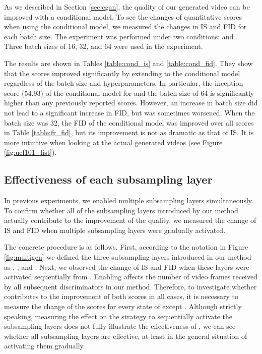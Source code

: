 \documentclass[twocolumn]{svjour3}
\def\Fig#1{Figure \ref{fig:#1}}
\def\Table#1{Table \ref{table:#1}}
\def\Sec#1{Section \ref{sec:#1}}
\begin{document}
As we described in \Sec{cgan}, the quality of our generated video
can be improved with a conditional model.
To see the changes of quantitative scores when using the conditional model,
we measured the changes in IS and FID for each batch size.
The experiment was performed under two conditions:  and .
Three batch sizes of 16, 32, and 64 were used in the experiment.

The results are shown in Tables \ref{table:cond_is} and \ref{table:cond_fid}.
They show that the scores improved significantly by extending to the conditional model
regardless of the batch size and hyperparameters.
In particular, the inception score (54.93) of the conditional model for 
and the batch size of 64 is significantly higher than any previously reported scores.
However, an increase in batch size did not lead to a significant increase in FID,
but was sometimes worsened.
When the batch size was 32, the FID of the conditional model was improved
over all scores in \Table{fr_fid},
but its improvement is not as dramatic as that of IS.
It is more intuitive when looking at the actual generated videos (see \Fig{ucf101_list}).


\subsection{Effectiveness of each subsampling layer}






In previous experiments, we enabled multiple subsampling layers simultaneously.
To confirm whether all of the subsampling layers introduced by our method
actually contribute to the improvement of the quality,
we measured the change of IS and FID
when multiple subsampling layers were gradually activated.












The concrete procedure is as follows.
First, according to the notation in \Fig{multigen}
we defined the three subsampling layers introduced in our method as
, , and .
Next, we observed the change of IS and FID
when these layers were activated sequentially from .
Enabling  affects the number of video frames
received by all subsequent discriminators in our method.
Therefore, to investigate whether  contributes to
the improvement of both scores in all cases,
it is necessary to measure the change of the scores
for every state of  except .
Although strictly speaking,
measuring the effect on the strategy to sequentially activate the subsampling layers
does not fully illustrate the effectiveness of ,
we can see whether all subsampling layers are effective,
at least in the general situation of activating them gradually.
\end{document}
